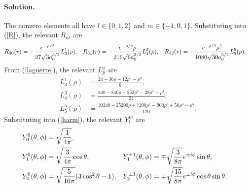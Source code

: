 \documentclass[11pt]{article}
\newcommand{\refeq}[1]{(\ref{#1})}
\newenvironment{solution}
{
    \paragraph{Solution.}
    \ignorespaces
}
{
}
\begin{document}
\begin{solution}
	The nonzero elements all have $l \in \{0, 1, 2\}$ and $m \in \{-1, 0, 1\}$.  Substituting into \refeq{R}, the relevant $R_{n l}$ are
	\begin{align*}
		R_{3 0}(r) &= -\frac{e^{-\rho / 2}}{27 \sqrt{3} a_0^{3/2}} L_3^1(\rho), &
		R_{3 1}(r) &= -\frac{e^{-\rho / 2} \rho}{216 \sqrt{6} a_0^{3/2}} L_4^3(\rho), &
		R_{3 2}(r) &= -\frac{e^{-\rho / 2} \rho^2}{1080 \sqrt{30} a_0^{3/2}} L_5^5(\rho).	\end{align*}
	From \refeq{laguerre}, the relevant $L_p^q$ are
	\begin{align*}
		L_3^1(\rho) &= \frac{24 - 36 \rho + 12 \rho^2 - \rho^3}{6}, \\
		L_4^3(\rho) &= \frac{840 - 840 \rho + 252 \rho^2 - 28 \rho^3 + \rho^4}{24}, \\
		L_5^5(\rho) &= \frac{30240 - 25200 \rho + 7200 \rho^2 - 900 \rho^3 + 50 \rho^4 - \rho^5}{120}.
	\end{align*}
	Substituting into \refeq{harm}, the relevant $Y_l^m$ are
	\begin{align*}
		Y_0^0(\theta, \phi) &= \sqrt{\frac{1}{4 \pi}}, \\
		Y_1^0(\theta, \phi) &= \sqrt{\frac{3}{4 \pi}} \cos\theta, &
		Y_1^{\pm 1}(\theta, \phi) &= \mp \sqrt{\frac{3}{8 \pi}} e^{\pm i \phi} \sin\theta, \\
		Y_2^0(\theta, \phi) &= \sqrt{\frac{5}{16 \pi}} (3 \cos^2\theta - 1), &
		Y_2^{\pm1}(\theta, \phi) &= \mp \sqrt{\frac{15}{8 \pi}} e^{\pm i \phi} \cos\theta \sin\theta.
	\end{align*}
	

\end{solution}
\end{document}
